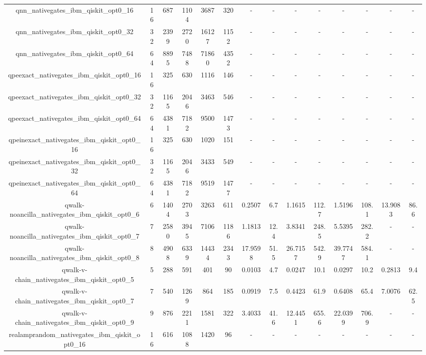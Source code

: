 \begin{table}[htb]
{\begin{tabular}{|c|c|c|c|c|c|c|c|c|c|c|c|c|c|}
qnn\_nativegates\_ibm\_qiskit\_opt0\_16 & 16 & 687 & 1104 & 3687 & 320 & - & - & - & - & - & - & - & - \\ 
qnn\_nativegates\_ibm\_qiskit\_opt0\_32 & 32 & 2399 & 2720 & 16127 & 1152 & - & - & - & - & - & - & - & - \\ 
qnn\_nativegates\_ibm\_qiskit\_opt0\_64 & 64 & 8895 & 7488 & 71860 & 4352 & - & - & - & - & - & - & - & - \\ 
qpeexact\_nativegates\_ibm\_qiskit\_opt0\_16 & 16 & 325 & 630 & 1116 & 146 & - & - & - & - & - & - & - & - \\ 
qpeexact\_nativegates\_ibm\_qiskit\_opt0\_32 & 32 & 1165 & 2046 & 3463 & 546 & - & - & - & - & - & - & - & - \\ 
qpeexact\_nativegates\_ibm\_qiskit\_opt0\_64 & 64 & 4381 & 7182 & 9500 & 1473 & - & - & - & - & - & - & - & - \\ 
qpeinexact\_nativegates\_ibm\_qiskit\_opt0\_16 & 16 & 325 & 630 & 1020 & 151 & - & - & - & - & - & - & - & - \\ 
qpeinexact\_nativegates\_ibm\_qiskit\_opt0\_32 & 32 & 1165 & 2046 & 3433 & 549 & - & - & - & - & - & - & - & - \\ 
qpeinexact\_nativegates\_ibm\_qiskit\_opt0\_64 & 64 & 4381 & 7182 & 9519 & 1477 & - & - & - & - & - & - & - & - \\ 
qwalk-noancilla\_nativegates\_ibm\_qiskit\_opt0\_6 & 6 & 1404 & 2703 & 3263 & 611 & 0.2507 & 6.7 & 1.1615 & 112.7 & 1.5196 & 108.1 & 13.9083 & 86.6 \\ 
qwalk-noancilla\_nativegates\_ibm\_qiskit\_opt0\_7 & 7 & 2580 & 3945 & 7106 & 1186 & 1.1813 & 12.4 & 3.8341 & 248.5 & 5.5395 & 282.2 & - & - \\ 
qwalk-noancilla\_nativegates\_ibm\_qiskit\_opt0\_8 & 8 & 4908 & 6339 & 14434 & 2343 & 17.9598 & 51.5 & 26.7157 & 542.9 & 39.7747 & 584.1 & - & - \\ 
qwalk-v-chain\_nativegates\_ibm\_qiskit\_opt0\_5 & 5 & 288 & 591 & 401 & 90 & 0.0103 & 4.7 & 0.0247 & 10.1 & 0.0297 & 10.2 & 0.2813 & 9.4 \\ 
qwalk-v-chain\_nativegates\_ibm\_qiskit\_opt0\_7 & 7 & 540 & 1269 & 864 & 185 & 0.0919 & 7.5 & 0.4423 & 61.9 & 0.6408 & 65.4 & 7.0076 & 62.5 \\ 
qwalk-v-chain\_nativegates\_ibm\_qiskit\_opt0\_9 & 9 & 876 & 2211 & 1581 & 322 & 3.4033 & 41.6 & 12.4451 & 655.6 & 22.0399 & 706.9 & - & - \\ 
realamprandom\_nativegates\_ibm\_qiskit\_opt0\_16 & 16 & 616 & 1088 & 1420 & 96 & - & - & - & - & - & - & - & - \\ 

\end{tabular}}
\end{table}
